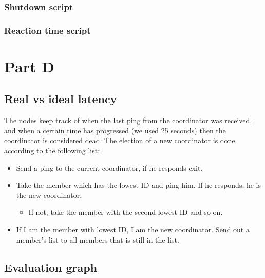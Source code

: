 \documentclass[paper=a4, fontsize=11pt]{scrartcl} %
\numberwithin{equation}{section} %
\numberwithin{figure}{section} %
\numberwithin{table}{section} %
\begin{document}
\subsubsection{Shutdown script}

\subsubsection{Reaction time script}

\section{Part D}


\subsection{Real vs ideal latency}
The nodes keep track of when the last ping from the coordinator was received, and when a certain time has progressed (we used 25 seconds) then the coordinator is considered dead. The election of a new coordinator is done according to the following list:
\begin{itemize}
	\item Send a ping to the current coordinator, if he responds exit.
	\item Take the member which has the lowest ID and ping him. If he responds, he is the new coordinator.
	\begin{itemize}
		\item If not, take the member with the second lowest ID and so on.
	\end{itemize}
	\item If I am the member with lowest ID, I am the new coordinator. Send out a member's list to all members that is still in the list.
\end{itemize}


\subsection{Evaluation graph}
\end{document}
